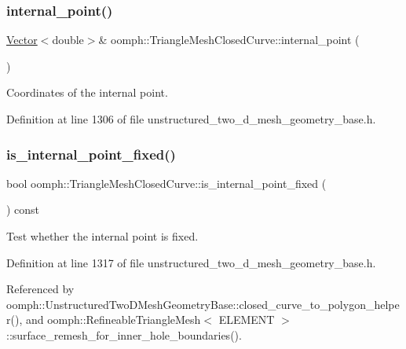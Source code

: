 \subsubsection{\texorpdfstring{internal\+\_\+point()}{internal\_point()}\hspace{0.1cm}{\footnotesize\ttfamily [2/2]}}
{\footnotesize\ttfamily \hyperlink{classoomph_1_1Vector}{Vector}$<$double$>$\& oomph\+::\+Triangle\+Mesh\+Closed\+Curve\+::internal\+\_\+point (\begin{DoxyParamCaption}{ }\end{DoxyParamCaption})\hspace{0.3cm}{\ttfamily [inline]}}



Coordinates of the internal point. 



Definition at line 1306 of file unstructured\+\_\+two\+\_\+d\+\_\+mesh\+\_\+geometry\+\_\+base.\+h.

\mbox{\label{classoomph_1_1TriangleMeshClosedCurve_a5d48fa39b4cde1ba1bdba129a1587f2f}} 
\subsubsection{\texorpdfstring{is\+\_\+internal\+\_\+point\+\_\+fixed()}{is\_internal\_point\_fixed()}}
{\footnotesize\ttfamily bool oomph\+::\+Triangle\+Mesh\+Closed\+Curve\+::is\+\_\+internal\+\_\+point\+\_\+fixed (\begin{DoxyParamCaption}{ }\end{DoxyParamCaption}) const\hspace{0.3cm}{\ttfamily [inline]}}



Test whether the internal point is fixed. 



Definition at line 1317 of file unstructured\+\_\+two\+\_\+d\+\_\+mesh\+\_\+geometry\+\_\+base.\+h.



Referenced by oomph\+::\+Unstructured\+Two\+D\+Mesh\+Geometry\+Base\+::closed\+\_\+curve\+\_\+to\+\_\+polygon\+\_\+helper(), and oomph\+::\+Refineable\+Triangle\+Mesh$<$ E\+L\+E\+M\+E\+N\+T $>$\+::surface\+\_\+remesh\+\_\+for\+\_\+inner\+\_\+hole\+\_\+boundaries().

